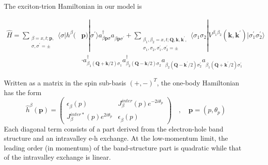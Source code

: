 \documentclass[aps,prb,superscriptaddress,letterpaper,amsmath,amssymb,twocolumn,preprintnumbers]{revtex4}
\begin{document}
The exciton-trion Hamiltonian in our model is
\begin{widetext}
\begin{align}
\hat{H} = \sum_{\substack{\beta = x,t; \mathbf{p}, \\ \sigma , \sigma^{\prime} = \pm}} \langle \sigma | h^{\beta} (  &\mathbf{p}) | \sigma^{\prime} \rangle a^{\dag}_{\beta \mathbf{p} \sigma} a^{}_{\beta \mathbf{p} \sigma^{\prime}}
+ \sum_{\substack{\beta_1 , \beta_2 = x,t; \mathbf{Q},\mathbf{k}, \mathbf{k}^{\prime} , \\ \sigma_1 , \sigma_2 , \sigma^{\prime}_1 , \sigma^{\prime}_2 = \pm}} \langle \sigma_1 \sigma_2 | V^{\beta_1 \beta_2} (\mathbf{k} , \mathbf{k}^{\prime}) | \sigma^{\prime}_1 \sigma^{\prime}_2 \rangle \nonumber \\
\label{hamiltonian-xt.equ}
&\cdot
a^{\dag}_{\beta_1 (\mathbf{Q}+\mathbf{k} / 2) \sigma_1}
a^{\dag}_{\beta_2 (\mathbf{Q}-\mathbf{k} / 2) \sigma_2}
a^{}_{\beta_2 (\mathbf{Q}-\mathbf{k}^{\prime} / 2) \sigma^{\prime}_2}
a^{}_{\beta_1 (\mathbf{Q}+\mathbf{k}^{\prime} / 2) \sigma^{\prime}_1}
\end{align}
\end{widetext}
Written as a matrix in the spin sub-basis $(+ , -)^T$, the one-body Hamiltonian has the form
\begin{equation}\label{h-one-body.equ}
\hat{h}^{\beta} (\mathbf{p}) =
\begin{pmatrix}
\epsilon^{}_{\beta} (p) & J^{inter}_{\beta} (p) e^{- 2 i \theta_p} \\
J^{inter \ast}_{\beta} (p) e^{2 i \theta_p} & \epsilon^{}_{\beta} (p)
\end{pmatrix}
\quad , \quad \mathbf{p} = (p, \theta_p)
\end{equation}
Each diagonal term consists of a part derived from the electron-hole band structure and an intravalley e-h exchange. At the low-momentum limit, the leading order (in momentum) of the band-structure part is quadratic while that of the intravalley exchange is linear.
\end{document}
